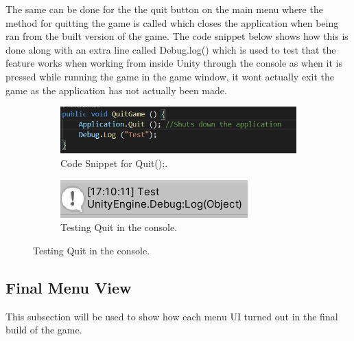 \newpage
The same can be done for the the quit button on the main menu where the method for quitting the game is called which closes the application when being ran from the built version of the game. The code snippet below shows how this is done along with an extra line called Debug.log() which is used to test that the feature works when working from inside Unity through the console as when it is pressed while running the game in the game window, it wont actually exit the game as the application has not actually been made.

\begin{figure}[h]
\centering
\begin{subfigure}{.5\textwidth}
\centering
  \includegraphics[width= 0.8\linewidth]{Images/Quit.PNG}
  \caption{Code Snippet for Quit();.}
  \label{fig:Quit}
  \end{subfigure}%
  \begin{subfigure}{.5\textwidth}
\centering
  \includegraphics[width= 0.8\linewidth]{Images/QuitTest.PNG}
  \caption{Testing Quit in the console.}
  \label{fig:Debug}
  \end{subfigure}%
\end{figure}
\subsection{Final Menu View}
This subsection will be used to show how each menu UI turned out in the final build of the game.

